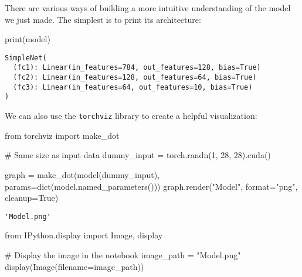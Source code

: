 \documentclass[
  letterpaper,
  DIV=11,
  numbers=noendperiod]{scrreprt}
\newenvironment{Shaded}{\begin{snugshade}}{\end{snugshade}}
\newcommand{\BuiltInTok}[1]{\textcolor[rgb]{0.00,0.23,0.31}{#1}}
\newcommand{\CommentTok}[1]{\textcolor[rgb]{0.37,0.37,0.37}{#1}}
\newcommand{\DecValTok}[1]{\textcolor[rgb]{0.68,0.00,0.00}{#1}}
\newcommand{\ImportTok}[1]{\textcolor[rgb]{0.00,0.46,0.62}{#1}}
\newcommand{\NormalTok}[1]{\textcolor[rgb]{0.00,0.23,0.31}{#1}}
\newcommand{\OperatorTok}[1]{\textcolor[rgb]{0.37,0.37,0.37}{#1}}
\newcommand{\StringTok}[1]{\textcolor[rgb]{0.13,0.47,0.30}{#1}}
\newcommand{\VariableTok}[1]{\textcolor[rgb]{0.07,0.07,0.07}{#1}}
\begin{document}
There are various ways of building a more intuitive understanding of the
model we just made. The simplest is to print its architecture:

\begin{Shaded}
\begin{Highlighting}[]
\BuiltInTok{print}\NormalTok{(model)}
\end{Highlighting}
\end{Shaded}

\begin{verbatim}
SimpleNet(
  (fc1): Linear(in_features=784, out_features=128, bias=True)
  (fc2): Linear(in_features=128, out_features=64, bias=True)
  (fc3): Linear(in_features=64, out_features=10, bias=True)
)
\end{verbatim}

We can also use the \texttt{torchviz} library to create a helpful
visualization:

\begin{Shaded}
\begin{Highlighting}[]
\ImportTok{from}\NormalTok{ torchviz }\ImportTok{import}\NormalTok{ make\_dot}

\CommentTok{\# Same size as input data}
\NormalTok{dummy\_input }\OperatorTok{=}\NormalTok{ torch.randn(}\DecValTok{1}\NormalTok{, }\DecValTok{28}\NormalTok{, }\DecValTok{28}\NormalTok{).cuda()}

\NormalTok{graph }\OperatorTok{=}\NormalTok{ make\_dot(model(dummy\_input), params}\OperatorTok{=}\BuiltInTok{dict}\NormalTok{(model.named\_parameters()))}
\NormalTok{graph.render(}\StringTok{"Model"}\NormalTok{, }\BuiltInTok{format}\OperatorTok{=}\StringTok{"png"}\NormalTok{, cleanup}\OperatorTok{=}\VariableTok{True}\NormalTok{)}
\end{Highlighting}
\end{Shaded}

\begin{verbatim}
'Model.png'
\end{verbatim}

\begin{Shaded}
\begin{Highlighting}[]
\ImportTok{from}\NormalTok{ IPython.display }\ImportTok{import}\NormalTok{ Image, display}

\CommentTok{\# Display the image in the notebook}
\NormalTok{image\_path }\OperatorTok{=} \StringTok{"Model.png"}
\NormalTok{display(Image(filename}\OperatorTok{=}\NormalTok{image\_path))}
\end{Highlighting}
\end{Shaded}
\end{document}
